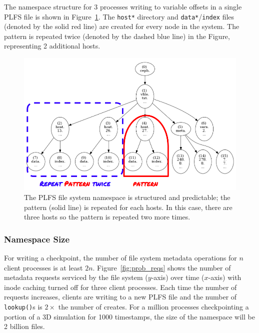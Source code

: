The namespace structure for 3 processes writing to variable offsets in a single
PLFS file is shown in Figure~\ref{fig:tree_plfs}. The \texttt{host*} directory
and \texttt{data*}/\texttt{index} files (denoted by the solid red line) are
created for every node in the system. The pattern is repeated twice (denoted by
the dashed blue line) in the Figure, representing 2 additional hosts.

\begin{figure}[tb]
\centering
  \includegraphics[width=1\linewidth]{figures/tree_plfs.png} 
  \caption{The PLFS file system namespace is structured and predictable; the
  pattern (solid line) is repeated for each hosts. In this case, there are three
  hosts so the pattern is repeated two more times. 
  }\label{fig:tree_plfs}
\end{figure}

\subsubsection{Namespace Size}

For writing a checkpoint, the number of file system metadata operations for
\(n\) client processes is at least \(2n\).   Figure~\ref{fig:prob_reqs} shows
the number of metadata requests serviced by the file system (\(y\)-axis) over
time (\(x\)-axis) with inode caching turned off for three client processes.
Each time the number of requests increases, clients are writing to a new PLFS
file and the number of \texttt{lookup()}s is \(2\times\) the number of creates.
For a million processes checkpointing a portion of a 3D simulation for 1000
timestamps, the size of the namespace will be 2 billion files.

